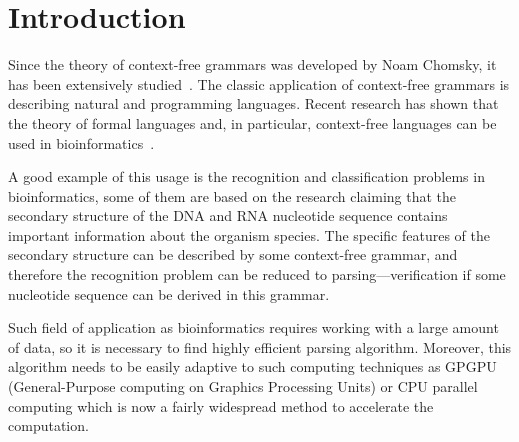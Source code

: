 \section{Introduction}

Since the theory of context-free grammars was developed by Noam Chomsky, it has been extensively studied~\cite{chomsky1959certain,chomsky1963algebraic}. 
The classic application of context-free grammars is describing natural and programming  languages. 
Recent  research has  shown  that the theory of formal languages and, in particular, context-free languages can be used in bioinformatics~\cite{rivas,knudsen,yuan,dowell}.

A good example of this usage is the recognition and classification problems in bioinformatics, some of them are based on the research claiming that the secondary structure of the DNA and RNA nucleotide sequence contains important information about the organism species. The specific features of the secondary structure can be described by some context-free grammar, and therefore the recognition problem can be reduced to parsing---verification if some nucleotide sequence can be derived in this grammar.

Such field of application as bioinformatics requires working with a large amount of data, so it is necessary to find highly efficient parsing algorithm. 
Moreover, this algorithm needs to be easily adaptive to such computing techniques as GPGPU (General-Purpose computing on Graphics Processing Units) or CPU parallel computing which is now a fairly widespread method to accelerate the computation.


